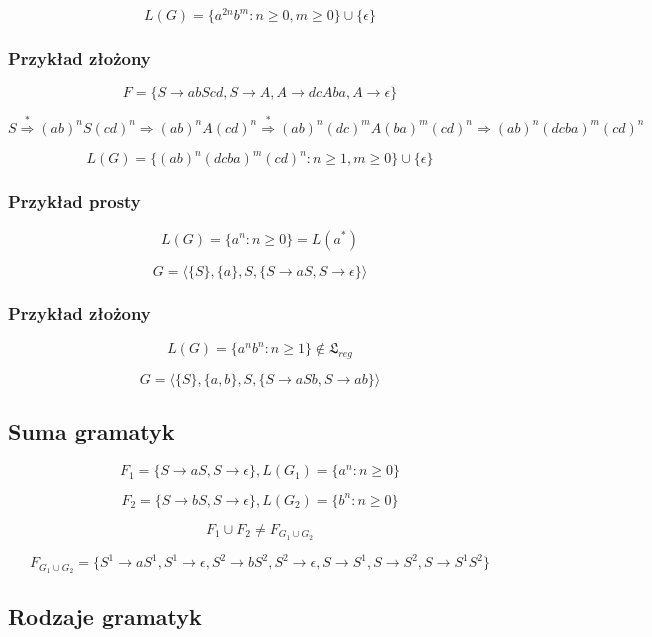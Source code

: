 \documentclass{../notatki}
\begin{document}
$$
L(G) = \{a^{2n}b^m : n \ge 0, m \ge 0\} \cup \{\epsilon\}
$$

\subsubsection{Przykład złożony}

$$
F = \{S \rightarrow abScd, S \rightarrow A, A \rightarrow dcAba, A
\rightarrow \epsilon\}
$$

$$
S \stackrel{*}{\Rightarrow} (ab)^nS(cd)^n \Rightarrow (ab)^nA(cd)^n
\stackrel{*}{\Rightarrow} (ab)^n(dc)^mA(ba)^m(cd)^n \Rightarrow
(ab)^n(dcba)^m(cd)^n
$$

$$
L(G) = \{(ab)^n(dcba)^m(cd)^n : n \ge 1, m \ge 0\} \cup \{\epsilon\}
$$

\subsubsection{Przykład prosty}

$$
L(G) = \{a^n : n \ge 0\} = L(a^*)
$$

$$
G = \langle \{S\}, \{a\}, S, \{S \rightarrow aS, S \rightarrow
\epsilon\} \rangle
$$

\subsubsection{Przykład złożony}

$$
L(G) = \{a^nb^n : n \ge 1\} \notin \mathfrak{L}_{reg}
$$

$$
G = \langle \{S\}, \{a, b\}, S, \{S \rightarrow aSb, S \rightarrow ab\} \rangle
$$

\subsection{Suma gramatyk}

$$
F_1 = \{S \rightarrow aS, S \rightarrow \epsilon\}, L(G_1) = \{a^n : n \ge 0\}
$$

$$
F_2 = \{S \rightarrow bS, S \rightarrow \epsilon\}, L(G_2) = \{b^n : n \ge 0\}
$$

$$
F_1 \cup F_2 \ne F_{G_1 \cup G_2}
$$

$$
F_{G_1 \cup G_2} = \{S^1 \rightarrow aS^1, S^1 \rightarrow \epsilon,
  S^2 \rightarrow bS^2, S^2 \rightarrow \epsilon, S \rightarrow S^1,
S \rightarrow S^2, S \rightarrow S^1S^2\}
$$

\subsection{Rodzaje gramatyk}
\end{document}
